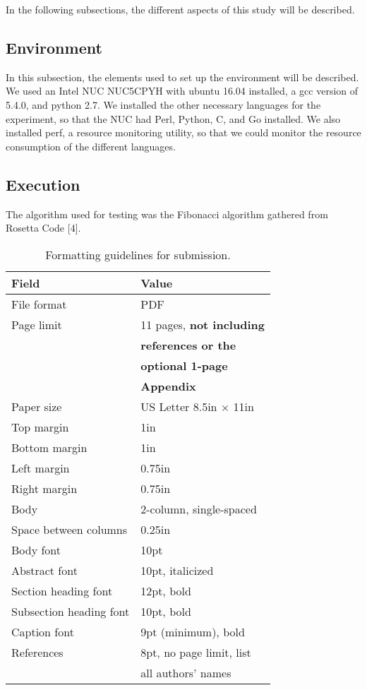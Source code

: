 \documentclass{sig-alternate}
\begin{document}
In the following subsections, the different aspects of this study will be described.

\subsection{Environment}

In this subsection, the elements used to set up the environment will be described. We used an Intel NUC NUC5CPYH with ubuntu 16.04 installed, a gcc version of 5.4.0, and python 2.7. We installed the other necessary languages for the experiment, so that the NUC had Perl, Python, C, and Go installed. We also installed perf, a resource monitoring utility, so that we could monitor the resource consumption of the different languages.    

\subsection{Execution}

The algorithm used for testing was the Fibonacci algorithm gathered from Rosetta Code [4].

\begin{scriptsize}
\begin{table}[h!]
  \centering
  \begin{tabular}{|l|l|}
    \hline
    \textbf{Field} & \textbf{Value}\\
    \hline
    \hline
    File format & PDF \\
    \hline
    Page limit & 11 pages, {\bf not including}\\
               & {\bf references or the}\\
               & {\bf optional 1-page }\\
               & {\bf Appendix}\\
    \hline
    Paper size & US Letter 8.5in $\times$ 11in\\
    \hline
    Top margin & 1in\\
    \hline
    Bottom margin & 1in\\
    \hline
    Left margin & 0.75in\\
    \hline
    Right margin & 0.75in\\
    \hline
    Body & 2-column, single-spaced\\
    \hline
    Space between columns & 0.25in\\
    \hline
    Body font & 10pt\\
    \hline
    Abstract font & 10pt, italicized\\
    \hline
    Section heading font & 12pt, bold\\
    \hline
    Subsection heading font & 10pt, bold\\
    \hline
    Caption font & 9pt (minimum), bold\\
    \hline
    References & 8pt, no page limit, list \\
               & all authors' names\\
    \hline
  \end{tabular}
  \caption{Formatting guidelines for submission. }
  \label{table:formatting}
\end{table}
\end{scriptsize}
\end{document}
